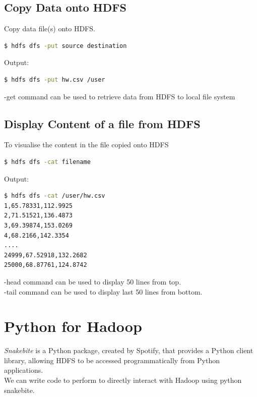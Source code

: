 \documentclass[pdf]{beamer}
\begin{document}
\subsection{Copy Data onto HDFS}
\begin{frame}[fragile]{}
Copy data file(s) onto HDFS.
\begin{lstlisting}[language=bash]
$ hdfs dfs -put source destination
\end{lstlisting}

Output: 
\begin{lstlisting}[language=bash]
$ hdfs dfs -put hw.csv /user
\end{lstlisting}
-get command can be used to retrieve data from HDFS to local file system
\end{frame}


\subsection{Display Content of a file from HDFS}
\begin{frame}[fragile]{}
To visualise the content in the file copied onto HDFS
\begin{lstlisting}[language=bash]
$ hdfs dfs -cat filename
\end{lstlisting}
Output: 
\begin{lstlisting}[language=bash]
$ hdfs dfs -cat /user/hw.csv 
1,65.78331,112.9925
2,71.51521,136.4873
3,69.39874,153.0269
4,68.2166,142.3354
....
24999,67.52918,132.2682
25000,68.87761,124.8742
\end{lstlisting}

-head command can be used to display 50 lines from top.
\\
-tail command can be used to display last 50 lines from bottom.
\end{frame}



\section{Python for Hadoop}
\begin{frame}[fragile]{}
\emph{Snakebite} is a Python package, created by Spotify, that provides a Python client library, allowing HDFS to be accessed programmatically from Python applications.
\\
We can write code to perform to directly interact with Hadoop using python snakebite.

\end{frame}
\end{document}
